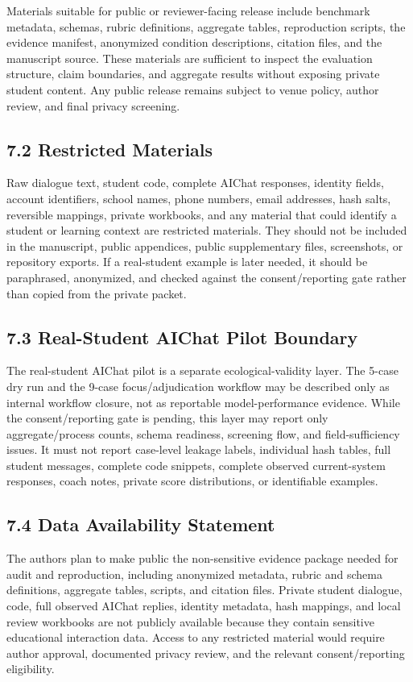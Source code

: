 \documentclass[11pt]{article}
\begin{document}
Materials suitable for public or reviewer-facing release include benchmark metadata, schemas, rubric definitions, aggregate tables, reproduction scripts, the evidence manifest, anonymized condition descriptions, citation files, and the manuscript source. These materials are sufficient to inspect the evaluation structure, claim boundaries, and aggregate results without exposing private student content. Any public release remains subject to venue policy, author review, and final privacy screening.

\subsection{7.2 Restricted Materials}

Raw dialogue text, student code, complete AIChat responses, identity fields, account identifiers, school names, phone numbers, email addresses, hash salts, reversible mappings, private workbooks, and any material that could identify a student or learning context are restricted materials. They should not be included in the manuscript, public appendices, public supplementary files, screenshots, or repository exports. If a real-student example is later needed, it should be paraphrased, anonymized, and checked against the consent/reporting gate rather than copied from the private packet.

\subsection{7.3 Real-Student AIChat Pilot Boundary}

The real-student AIChat pilot is a separate ecological-validity layer. The 5-case dry run and the 9-case focus/adjudication workflow may be described only as internal workflow closure, not as reportable model-performance evidence. While the consent/reporting gate is pending, this layer may report only aggregate/process counts, schema readiness, screening flow, and field-sufficiency issues. It must not report case-level leakage labels, individual hash tables, full student messages, complete code snippets, complete observed current-system responses, coach notes, private score distributions, or identifiable examples.

\subsection{7.4 Data Availability Statement}

The authors plan to make public the non-sensitive evidence package needed for audit and reproduction, including anonymized metadata, rubric and schema definitions, aggregate tables, scripts, and citation files. Private student dialogue, code, full observed AIChat replies, identity metadata, hash mappings, and local review workbooks are not publicly available because they contain sensitive educational interaction data. Access to any restricted material would require author approval, documented privacy review, and the relevant consent/reporting eligibility.
\end{document}
